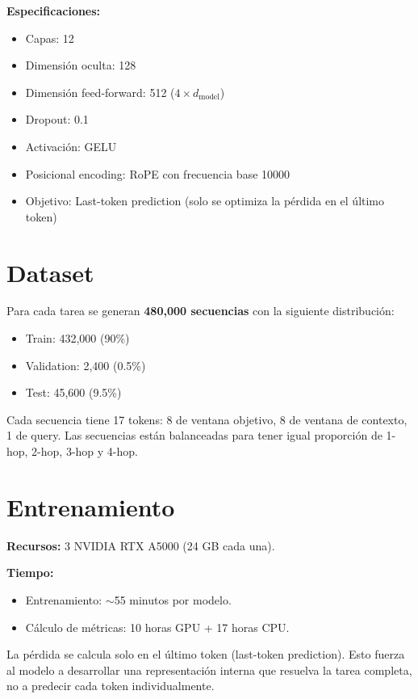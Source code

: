 \documentclass[12pt,a4paper,oneside]{report}
\begin{document}
\textbf{Especificaciones:}
\begin{itemize}
    \item Capas: 12
    \item Dimensión oculta: 128
    \item Dimensión feed-forward: 512 ($4\times d_\text{model}$)
    \item Dropout: 0.1
    \item Activación: GELU
    \item Posicional encoding: RoPE con frecuencia base 10000
    \item Objetivo: Last-token prediction (solo se optimiza la pérdida en el último token)
\end{itemize}

\section{Dataset}

Para cada tarea se generan \textbf{480,000 secuencias} con la siguiente distribución:
\begin{itemize}
    \item Train: 432,000 (90\%)
    \item Validation: 2,400 (0.5\%)
    \item Test: 45,600 (9.5\%)
\end{itemize}

Cada secuencia tiene 17 tokens: 8 de ventana objetivo, 8 de ventana de contexto, 1 de query. Las secuencias están balanceadas para tener igual proporción de 1-hop, 2-hop, 3-hop y 4-hop.

\section{Entrenamiento}

\textbf{Recursos:} 3 NVIDIA RTX A5000 (24 GB cada una).

\textbf{Tiempo:}
\begin{itemize}
    \item Entrenamiento: $\sim$55 minutos por modelo.
    \item Cálculo de métricas: 10 horas GPU + 17 horas CPU.
\end{itemize}

La pérdida se calcula solo en el último token (last-token prediction). Esto fuerza al modelo a desarrollar una representación interna que resuelva la tarea completa, no a predecir cada token individualmente.
\end{document}
